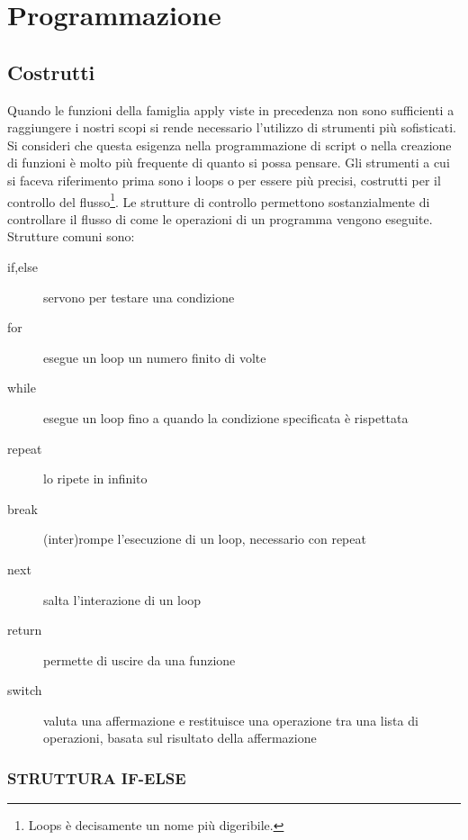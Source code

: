 \chapter{Programmazione}

\section{Costrutti}
Quando le funzioni della famiglia \textsf{apply} viste in precedenza non sono sufficienti a raggiungere i nostri scopi si rende necessario l'utilizzo di strumenti più sofisticati. Si consideri che questa esigenza nella programmazione di script o nella creazione di funzioni è molto più frequente di quanto si possa pensare.  Gli strumenti a cui si faceva riferimento prima sono i \textsf{loops} o per essere più precisi, costrutti per il controllo del flusso\footnote{\textsf{Loops} è decisamente un nome più digeribile.}.
Le strutture di controllo permettono sostanzialmente di controllare il flusso di come le operazioni di un programma vengono eseguite. Strutture comuni sono:

\begin{description}
\item[if,else] servono per testare una condizione \\
\item[for] esegue un loop un numero finito di volte \\
\item[while] esegue un loop fino a quando la condizione specificata è rispettata \\
\item[repeat] lo ripete in infinito \\
\item[break] (inter)rompe l'esecuzione di un loop, necessario con repeat \\
\item[next] salta l'interazione di un loop \\
\item[return] permette di uscire da una funzione \\
\item[switch] valuta una affermazione e restituisce una operazione tra una lista di operazioni, basata sul risultato della affermazione\\
\end{description}

\subsection{STRUTTURA IF-ELSE}

